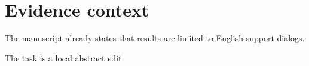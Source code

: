 \section{Evidence context}
The manuscript already states that results are limited to English support dialogs.

The task is a local abstract edit.

